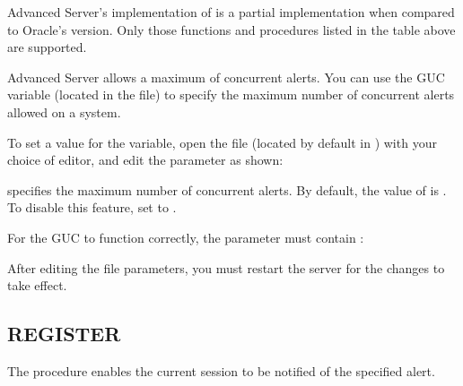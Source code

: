 \documentclass[letterpaper,10pt,english,openany,oneside]{sphinxmanual}
\begin{document}
Advanced Server’s implementation of  is a partial
implementation when compared to Oracle’s version. Only those functions
and procedures listed in the table above are supported.

Advanced Server allows a maximum of  concurrent alerts. You can use
the  GUC variable (located in the 
file) to specify the maximum number of concurrent alerts allowed on a
system.

To set a value for the  variable, open the
 file (located by default in )
with your choice of editor, and edit the 
parameter as shown:
\begin{quote}

\end{quote}


 specifies the maximum number of concurrent alerts. By
default, the value of  is . To disable this
feature, set  to .

For the  GUC to function correctly, the
 parameter must contain :
\begin{quote}

\end{quote}

After editing the  file parameters, you must restart the
server for the changes to take effect.

\ignorespaces 

\subsection{REGISTER}
\label{\detokenize{dbms_alert:register}}\label{\detokenize{dbms_alert:index-1}}
The  procedure enables the current session to be notified of the specified alert.
\begin{quote}

\end{quote}
\end{document}
